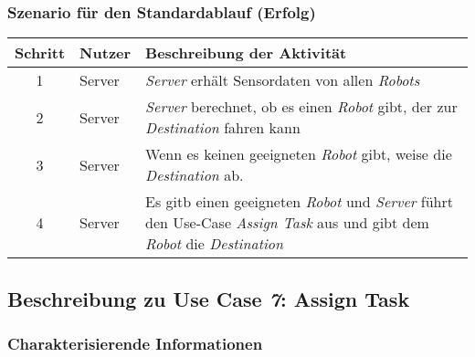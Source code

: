 			\subsubsection*{Szenario für den Standardablauf (Erfolg)}

			\begin{table}[H]
				\centering
				\begin{tabularx}{\textwidth}{@{}cp{2cm}X@{}}
				\hline
				Schritt & Nutzer & Beschreibung der Aktivität \\ \hline
				1 & Server & \emph{Server} erhält Sensordaten von allen \emph{Robots} \\
				2 & Server & \emph{Server} berechnet, ob es einen \emph{Robot} gibt, der zur \emph{Destination} fahren kann\\
				3 & Server & Wenn es keinen geeigneten \emph{Robot} gibt, weise die \emph{Destination} ab. \\
				4 & Server & Es gitb einen geeigneten \emph{Robot} und \emph{Server} führt den Use-Case \textit{Assign Task} aus und gibt dem \emph{Robot} die \emph{Destination}\\
				\hline
				\end{tabularx}
			\end{table}

			
		\pagebreak

		\subsection{Beschreibung zu Use Case \emph{7}: Assign Task}

			\subsubsection*{Charakterisierende Informationen}

